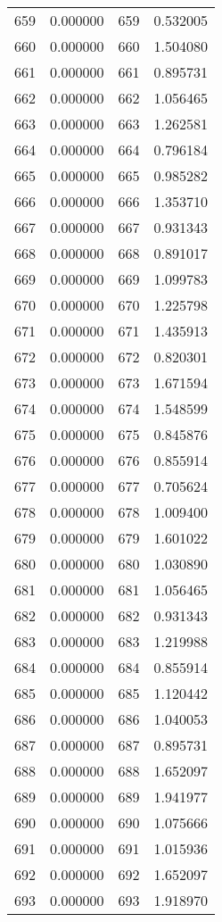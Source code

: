 \documentclass[12pt]{article}
\begin{document}
\begin{longtable}{@{}cccc@{}}
659 & 0.000000 & 659 & 0.532005 \\
660 & 0.000000 & 660 & 1.504080 \\
661 & 0.000000 & 661 & 0.895731 \\
662 & 0.000000 & 662 & 1.056465 \\
663 & 0.000000 & 663 & 1.262581 \\
664 & 0.000000 & 664 & 0.796184 \\
665 & 0.000000 & 665 & 0.985282 \\
666 & 0.000000 & 666 & 1.353710 \\
667 & 0.000000 & 667 & 0.931343 \\
668 & 0.000000 & 668 & 0.891017 \\
669 & 0.000000 & 669 & 1.099783 \\
670 & 0.000000 & 670 & 1.225798 \\
671 & 0.000000 & 671 & 1.435913 \\
672 & 0.000000 & 672 & 0.820301 \\
673 & 0.000000 & 673 & 1.671594 \\
674 & 0.000000 & 674 & 1.548599 \\
675 & 0.000000 & 675 & 0.845876 \\
676 & 0.000000 & 676 & 0.855914 \\
677 & 0.000000 & 677 & 0.705624 \\
678 & 0.000000 & 678 & 1.009400 \\
679 & 0.000000 & 679 & 1.601022 \\
680 & 0.000000 & 680 & 1.030890 \\
681 & 0.000000 & 681 & 1.056465 \\
682 & 0.000000 & 682 & 0.931343 \\
683 & 0.000000 & 683 & 1.219988 \\
684 & 0.000000 & 684 & 0.855914 \\
685 & 0.000000 & 685 & 1.120442 \\
686 & 0.000000 & 686 & 1.040053 \\
687 & 0.000000 & 687 & 0.895731 \\
688 & 0.000000 & 688 & 1.652097 \\
689 & 0.000000 & 689 & 1.941977 \\
690 & 0.000000 & 690 & 1.075666 \\
691 & 0.000000 & 691 & 1.015936 \\
692 & 0.000000 & 692 & 1.652097 \\
693 & 0.000000 & 693 & 1.918970 \\

\end{longtable}
\end{document}
